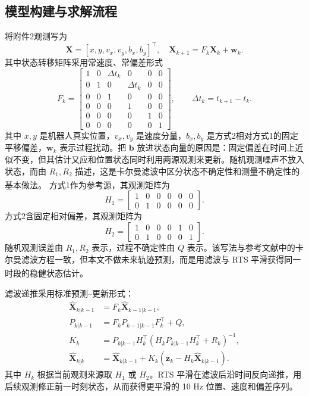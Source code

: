 \documentclass{cumcmthesis}
\newcommand{\upcite}[1]{\textsuperscript{\cite{#1}}}
\begin{document}
\subsection{模型构建与求解流程}
将附件2观测写为
\begin{equation}
  \bm X=[x,y,v_x,v_y,b_x,b_y]^\top,\quad
  \bm X_{k+1}=F_k\bm X_k+\bm w_k.
\end{equation}
其中状态转移矩阵采用常速度、常偏差形式
\begin{equation}
  F_k=
  \begin{bmatrix}
    1&0&\Delta t_k&0&0&0\\
    0&1&0&\Delta t_k&0&0\\
    0&0&1&0&0&0\\
    0&0&0&1&0&0\\
    0&0&0&0&1&0\\
    0&0&0&0&0&1
  \end{bmatrix},
  \qquad \Delta t_k=t_{k+1}-t_k.
\end{equation}
其中 $x,y$ 是机器人真实位置，$v_x,v_y$ 是速度分量，$b_x,b_y$ 是方式2相对方式1的固定平移偏差，$\bm w_k$ 表示过程扰动。把 $\bm b$ 放进状态向量的原因是：固定偏差在时间上近似不变，但其估计又应和位置状态同时利用两源观测来更新。随机观测噪声不放入状态，而由 $R_1,R_2$ 描述，这是卡尔曼滤波中区分状态不确定性和测量不确定性的基本做法\upcite{kalman}。
方式1作为参考源，其观测矩阵为
\begin{equation}
  H_1=\begin{bmatrix}1&0&0&0&0&0\\0&1&0&0&0&0\end{bmatrix}.
\end{equation}
方式2含固定相对偏差，其观测矩阵为
\begin{equation}
  H_2=\begin{bmatrix}1&0&0&0&1&0\\0&1&0&0&0&1\end{bmatrix}.
\end{equation}
随机观测误差由 $R_1,R_2$ 表示，过程不确定性由 $Q$ 表示。该写法与参考文献中的卡尔曼滤波方程一致，但本文不做未来轨迹预测，而是用滤波与 RTS 平滑获得同一时段的稳健状态估计\upcite{rts}。

滤波递推采用标准预测--更新形式：
\begin{align}
  \hat{\bm X}_{k|k-1}&=F_k\hat{\bm X}_{k-1|k-1},\\
  P_{k|k-1}&=F_kP_{k-1|k-1}F_k^\top+Q,\\
  K_k&=P_{k|k-1}H_k^\top(H_kP_{k|k-1}H_k^\top+R_k)^{-1},\\
  \hat{\bm X}_{k|k}&=\hat{\bm X}_{k|k-1}
  +K_k(\bm z_k-H_k\hat{\bm X}_{k|k-1}).
\end{align}
其中 $H_k$ 根据当前观测来源取 $H_1$ 或 $H_2$。RTS 平滑在滤波后沿时间反向递推，用后续观测修正前一时刻状态，从而获得更平滑的 10 Hz 位置、速度和偏差序列。
\end{document}
